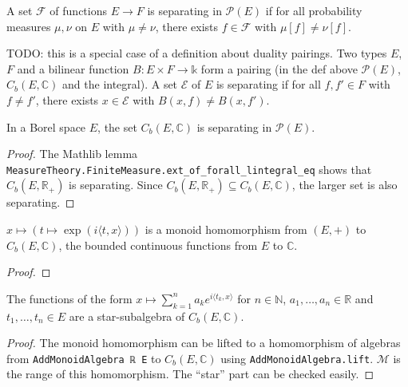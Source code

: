 \begin{definition}\label{def:separating}
A set $\mathcal F$ of functions $E \to F$ is separating in $\mathcal P(E)$ if for all probability measures $\mu, \nu$ on $E$ with $\mu \ne \nu$, there exists $f \in \mathcal F$ with $\mu[f] \ne \nu[f]$.
\end{definition}

TODO: this is a special case of a definition about duality pairings. Two types $E$, $F$ and a bilinear function $B : E \times F \to \mathbb{k}$ form a pairing (in the def above $\mathcal P(E)$, $C_b(E, \mathbb{C})$ and the integral). A set $\mathcal E$ of $E$ is separating if for all $f, f' \in F$ with $f \ne f'$, there exists $x \in \mathcal E$ with $B(x, f) \ne B(x, f')$. 

\begin{lemma}\label{lem:bounded_continuous_separating}
In a Borel space $E$, the set $C_b(E, \mathbb{C})$ is separating in $\mathcal P(E)$.
\end{lemma}

\begin{proof}
The Mathlib lemma \texttt{MeasureTheory.FiniteMeasure.ext\_of\_forall\_lintegral\_eq} shows that $C_b(E, \mathbb{R}_+)$ is separating. Since $C_b(E, \mathbb{R}_{+}) \subseteq C_b(E, \mathbb{C})$, the larger set is also separating.
\end{proof}

\begin{lemma}\label{lem:exp_character}
$x \mapsto (t \mapsto \exp(i \langle t, x \rangle))$ is a monoid homomorphism from $(E,+)$ to $C_b(E, \mathbb{C})$, the bounded continuous functions from $E$ to $\mathbb{C}$.
\end{lemma}

\begin{proof}
\end{proof}

\begin{lemma}\label{lem:starSubalgebra_expPoly}
The functions of the form $x \mapsto \sum_{k=1}^n a_k e^{i\langle t_k, x\rangle}$ for $n \in \mathbb{N}$, $a_1, \ldots, a_n \in \mathbb{R}$ and $t_1, \ldots, t_n \in E$ are a star-subalgebra of $C_b(E, \mathbb{C})$. 
\end{lemma}

\begin{proof}
The monoid homomorphism can be lifted to a homomorphism of algebras from \texttt{AddMonoidAlgebra ℝ E} to $C_b(E, \mathbb{C})$ using \texttt{AddMonoidAlgebra.lift}. $\mathcal M$ is the range of this homomorphism. The ``star'' part can be checked easily.
\end{proof}

